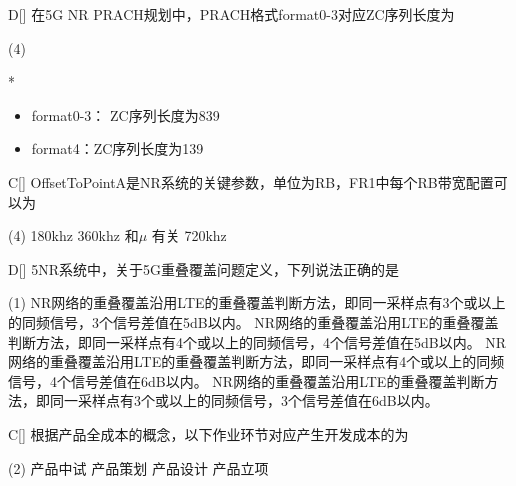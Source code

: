 \begin{choice}{D}[]
    在5G NR PRACH规划中，PRACH格式format0-3对应ZC序列长度为
    \begin{tasks}(4)
    \end{tasks}
\end{choice}
\begin{solution}*
    \begin{itemize}
        \item  format0-3： ZC序列长度为839
        \item  format4：ZC序列长度为139

    \end{itemize}


\end{solution}
\begin{choice}{C}[]
    OffsetToPointA是NR系统的关键参数，单位为RB，FR1中每个RB带宽配置可以为
    \begin{tasks}(4)
        \task 180khz
        \task 360khz
        \task 和$\mu$ 有关
        \task 720khz
    \end{tasks}
\end{choice}


\begin{choice}{D}[]
    5NR系统中，关于5G重叠覆盖问题定义，下列说法正确的是
    \begin{tasks}(1)
        \task NR网络的重叠覆盖沿用LTE的重叠覆盖判断方法，即同一采样点有3个或以上的同频信号，3个信号差值在5dB以内。
        \task NR网络的重叠覆盖沿用LTE的重叠覆盖判断方法，即同一采样点有4个或以上的同频信号，4个信号差值在5dB以内。
        \task NR网络的重叠覆盖沿用LTE的重叠覆盖判断方法，即同一采样点有4个或以上的同频信号，4个信号差值在6dB以内。
        \task NR网络的重叠覆盖沿用LTE的重叠覆盖判断方法，即同一采样点有3个或以上的同频信号，3个信号差值在6dB以内。
    \end{tasks}
\end{choice}



\begin{choice}{C}[]
    根据产品全成本的概念，以下作业环节对应产生开发成本的为
    \begin{tasks}(2)
        \task 产品中试
        \task 产品策划
        \task 产品设计
        \task 产品立项
    \end{tasks}
\end{choice}



